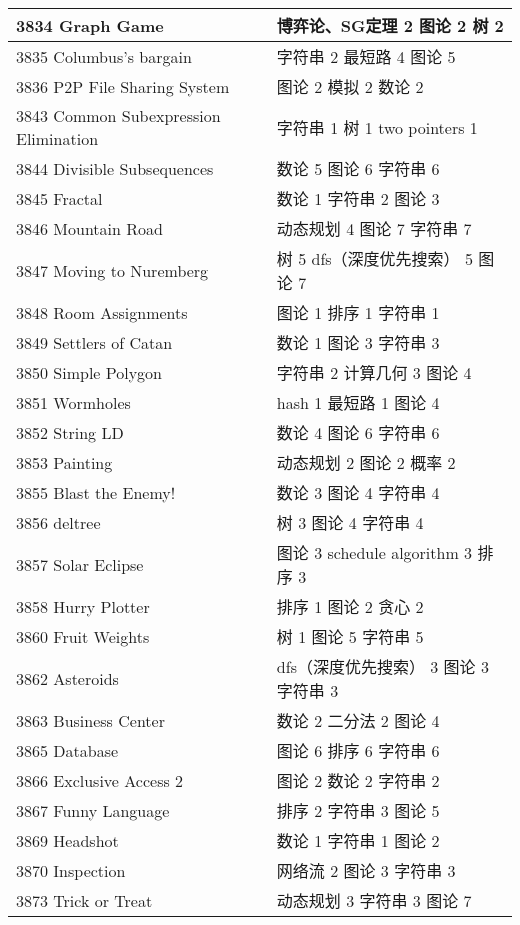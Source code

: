 \begin{longtable}{| p{} | p{} |}
 3834 Graph Game  & 博弈论、SG定理 2 图论 2 树 2 \\ \hline
 3835 Columbus's bargain  & 字符串 2 最短路 4 图论 5 \\ \hline
 3836 P2P File Sharing System  & 图论 2 模拟 2 数论 2 \\ \hline
 3843 Common Subexpression Elimination  & 字符串 1 树 1 two pointers 1 \\ \hline
 3844 Divisible Subsequences  & 数论 5 图论 6 字符串 6 \\ \hline
 3845 Fractal  & 数论 1 字符串 2 图论 3 \\ \hline
 3846 Mountain Road  & 动态规划 4 图论 7 字符串 7 \\ \hline
 3847 Moving to Nuremberg  & 树 5 dfs（深度优先搜索） 5 图论 7 \\ \hline
 3848 Room Assignments  & 图论 1 排序 1 字符串 1 \\ \hline
 3849 Settlers of Catan  & 数论 1 图论 3 字符串 3 \\ \hline
 3850 Simple Polygon  & 字符串 2 计算几何 3 图论 4 \\ \hline
 3851 Wormholes  & hash 1 最短路 1 图论 4 \\ \hline
 3852 String LD  & 数论 4 图论 6 字符串 6 \\ \hline
 3853 Painting  & 动态规划 2 图论 2 概率 2 \\ \hline
 3855 Blast the Enemy!  & 数论 3 图论 4 字符串 4 \\ \hline
 3856 deltree  & 树 3 图论 4 字符串 4 \\ \hline
 3857 Solar Eclipse  & 图论 3 schedule algorithm 3 排序 3 \\ \hline
 3858 Hurry Plotter  & 排序 1 图论 2 贪心 2 \\ \hline
 3860 Fruit Weights  & 树 1 图论 5 字符串 5 \\ \hline
 3862 Asteroids  & dfs（深度优先搜索） 3 图论 3 字符串 3 \\ \hline
 3863 Business Center  & 数论 2 二分法 2 图论 4 \\ \hline
 3865 Database  & 图论 6 排序 6 字符串 6 \\ \hline
 3866 Exclusive Access 2  & 图论 2 数论 2 字符串 2 \\ \hline
 3867 Funny Language  & 排序 2 字符串 3 图论 5 \\ \hline
 3869 Headshot  & 数论 1 字符串 1 图论 2 \\ \hline
 3870 Inspection  & 网络流 2 图论 3 字符串 3 \\ \hline
 3873 Trick or Treat  & 动态规划 3 字符串 3 图论 7 \\ \hline

\end{longtable}
